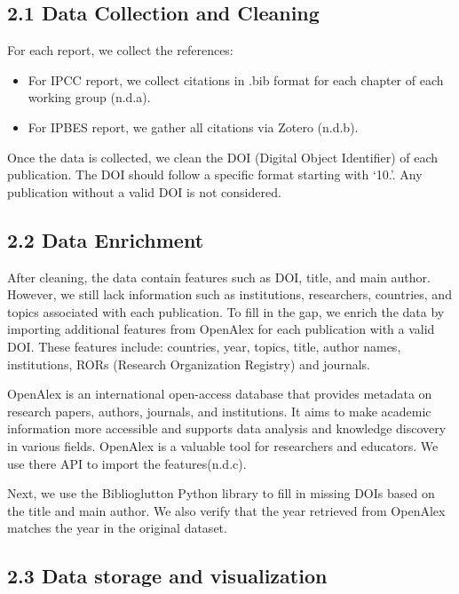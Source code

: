 \documentclass[
]{article}
\providecommand{\tightlist}{%
  \setlength{\itemsep}{0pt}\setlength{\parskip}{0pt}}
\begin{document}
\hypertarget{data-collection-and-cleaning}{%
\subsection{2.1 Data Collection and
Cleaning}\label{data-collection-and-cleaning}}

For each report, we collect the references:

\begin{itemize}
\tightlist
\item
  For IPCC report, we collect citations in .bib format for each chapter
  of each working group (n.d.a).
\item
  For IPBES report, we gather all citations via Zotero (n.d.b).
\end{itemize}

Once the data is collected, we clean the DOI (Digital Object Identifier)
of each publication. The DOI should follow a specific format starting
with `10.'. Any publication without a valid DOI is not considered.

\hypertarget{data-enrichment}{%
\subsection{2.2 Data Enrichment}\label{data-enrichment}}

After cleaning, the data contain features such as DOI, title, and main
author. However, we still lack information such as institutions,
researchers, countries, and topics associated with each publication. To
fill in the gap, we enrich the data by importing additional features
from OpenAlex for each publication with a valid DOI. These features
include: countries, year, topics, title, author names, institutions,
RORs (Research Organization Registry) and journals.

OpenAlex is an international open-access database that provides metadata
on research papers, authors, journals, and institutions. It aims to make
academic information more accessible and supports data analysis and
knowledge discovery in various fields. OpenAlex is a valuable tool for
researchers and educators. We use there API to import the
features(n.d.c).

Next, we use the Biblioglutton Python library to fill in missing DOIs
based on the title and main author. We also verify that the year
retrieved from OpenAlex matches the year in the original dataset.

\hypertarget{data-storage-and-visualization}{%
\subsection{2.3 Data storage and
visualization}\label{data-storage-and-visualization}}
\end{document}
